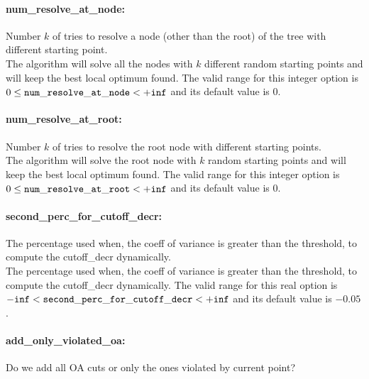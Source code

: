 \paragraph{num\_resolve\_at\_node:}\label{sec:num_resolve_at_node} Number $k$ of tries to resolve a node (other than the root) of the tree with different starting point. $\;$ \\
 The algorithm will solve all the nodes with $k$
different random starting points and will keep
the best local optimum found. The valid range for this integer option is
$0 \le {\tt num\_resolve\_at\_node } <  {\tt +inf}$
and its default value is $0$.


\paragraph{num\_resolve\_at\_root:}\label{sec:num_resolve_at_root} Number $k$ of tries to resolve the root node with different starting points. $\;$ \\
 The algorithm will solve the root node with $k$
random starting points and will keep the best
local optimum found. The valid range for this integer option is
$0 \le {\tt num\_resolve\_at\_root } <  {\tt +inf}$
and its default value is $0$.


\paragraph{second\_perc\_for\_cutoff\_decr:}\label{sec:second_perc_for_cutoff_decr} The percentage used when, the coeff of variance is greater than the threshold, to compute the cutoff\_decr dynamically. $\;$ \\
 The percentage used when, the coeff of variance
is greater than the threshold, to compute the
cutoff\_decr dynamically. The valid range for this real option is 
${\tt -inf} <  {\tt second\_perc\_for\_cutoff\_decr } <  {\tt +inf}$
and its default value is $-0.05$.


\paragraph{add\_only\_violated\_oa:}\label{sec:add_only_violated_oa} Do we add all OA cuts or only the ones violated by current point? $\;$ \\

